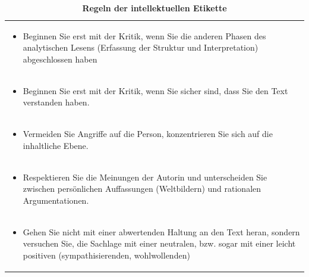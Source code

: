 \documentclass[]{book}
\providecommand{\tightlist}{%
  \setlength{\itemsep}{0pt}\setlength{\parskip}{0pt}}
\theoremstyle{definition}
\theoremstyle{definition}
\theoremstyle{definition}
\theoremstyle{remark}
\begin{document}
\begin{longtable}[]{@{}l@{}}
\caption{\textbf{\label{tab:etikette} Regeln der intellektuellen
Etikette}}\tabularnewline
\toprule
\begin{minipage}[t]{0.97\columnwidth}\raggedright\strut
\begin{itemize}
\tightlist
\item
  Beginnen Sie erst mit der Kritik, wenn Sie die anderen Phasen des
  analytischen Lesens (Erfassung der Struktur und Interpretation)
  abgeschlossen haben \vspace{-6mm}
\end{itemize}\strut
\end{minipage}\tabularnewline
\begin{minipage}[t]{0.97\columnwidth}\raggedright\strut
\begin{itemize}
\tightlist
\item
  Beginnen Sie erst mit der Kritik, wenn Sie sicher sind, dass Sie den
  Text verstanden haben. \vspace{-6mm}
\end{itemize}\strut
\end{minipage}\tabularnewline
\begin{minipage}[t]{0.97\columnwidth}\raggedright\strut
\begin{itemize}
\tightlist
\item
  Vermeiden Sie Angriffe auf die Person, konzentrieren Sie sich auf die
  inhaltliche Ebene. \vspace{-6mm}
\end{itemize}\strut
\end{minipage}\tabularnewline
\begin{minipage}[t]{0.97\columnwidth}\raggedright\strut
\begin{itemize}
\tightlist
\item
  Respektieren Sie die Meinungen der Autorin und unterscheiden Sie
  zwischen persönlichen Auffassungen (Weltbildern) und rationalen
  Argumentationen. \vspace{-6mm}
\end{itemize}\strut
\end{minipage}\tabularnewline
\begin{minipage}[t]{0.97\columnwidth}\raggedright\strut
\begin{itemize}
\tightlist
\item
  Gehen Sie nicht mit einer abwertenden Haltung an den Text heran,
  sondern versuchen Sie, die Sachlage mit einer neutralen, bzw. sogar
  mit einer leicht positiven (sympathisierenden, wohlwollenden)

\end{itemize}
\end{minipage}
\end{longtable}
\end{document}
